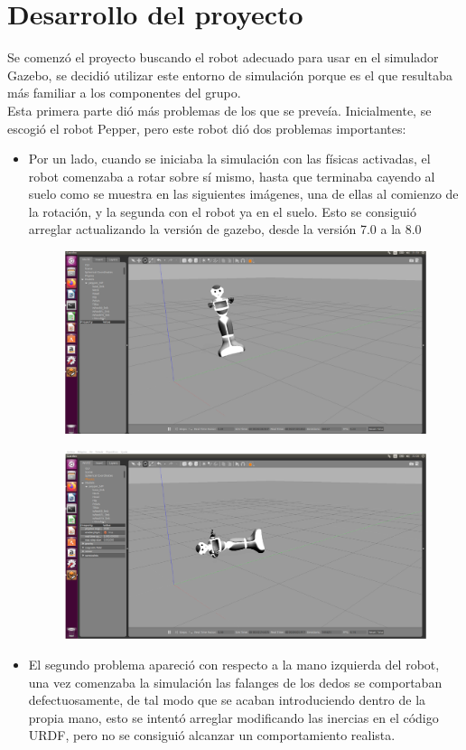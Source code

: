 \usepackage{graphicx}
\section{Desarrollo del proyecto}
Se comenzó el proyecto buscando el robot adecuado para usar en el simulador Gazebo, se decidió utilizar este entorno de simulación porque es el que resultaba más familiar a los componentes del grupo.\\
Esta primera parte dió más problemas de los que se preveía. 
Inicialmente, se escogió el robot Pepper, pero este robot dió dos problemas importantes:
\begin{itemize}
  \item Por un lado, cuando se iniciaba la simulación con las físicas activadas, el robot comenzaba a rotar sobre sí mismo, hasta que terminaba cayendo al suelo como se muestra en las siguientes imágenes, una de ellas al comienzo de la rotación, y la segunda con el robot ya en el suelo. Esto se consiguió arreglar actualizando la versión de gazebo, desde la versión 7.0 a la 8.0
\begin{figure}
  \includegraphics{images/peppergiro.png}
\end{figure}
\begin{figure}
  \includegraphics{images/peppersuelo.png}
\end{figure}
\item El segundo problema apareció con respecto a la mano izquierda del robot, una vez comenzaba la simulación las falanges de los dedos se comportaban defectuosamente, de tal modo que se acaban introduciendo dentro de la propia mano, esto se intentó arreglar modificando las inercias en el código URDF, pero no se consiguió alcanzar un comportamiento realista.\\
\end{itemize}
